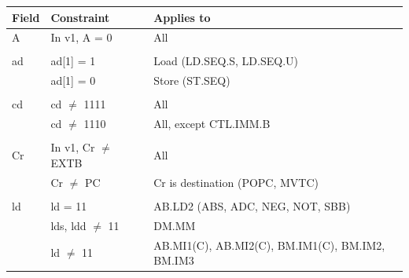 \begin{table}
\begin{center}
\scriptsize
\setlength{\tabcolsep}{4pt}
\begin{tabular}{lll}
\hline
Field            & Constraint                                       & Applies to                                        \\ \hline
A                & In v1, A = 0                                     & All                                               \\
                 &                                                  &                                                   \\
ad               & ad[1] = 1                                        & Load (LD.SEQ.S, LD.SEQ.U)                         \\
                 & ad[1] = 0                                        & Store (ST.SEQ)                                    \\
                 &                                                  &                                                   \\
cd               & cd $\ne$ 1111                                    & All                                               \\
                 & cd $\ne$ 1110                                    & All, except CTL.IMM.B                             \\
                 &                                                  &                                                   \\
Cr               & In v1, Cr $\ne$ EXTB                             & All                                               \\
                 & Cr $\ne$ PC                                      & Cr is destination (POPC, MVTC)                    \\
                 &                                                  &                                                   \\
ld               & ld = 11                                          & AB.LD2 (ABS, ADC, NEG, NOT, SBB)                  \\
                 & lds, ldd $\ne$ 11                                & DM.MM                                             \\
                 & ld $\ne$ 11                                      & AB.MI1(C), AB.MI2(C), BM.IM1(C), BM.IM2, BM.IM3   \\

\end{tabular}
\end{center}
\end{table}
